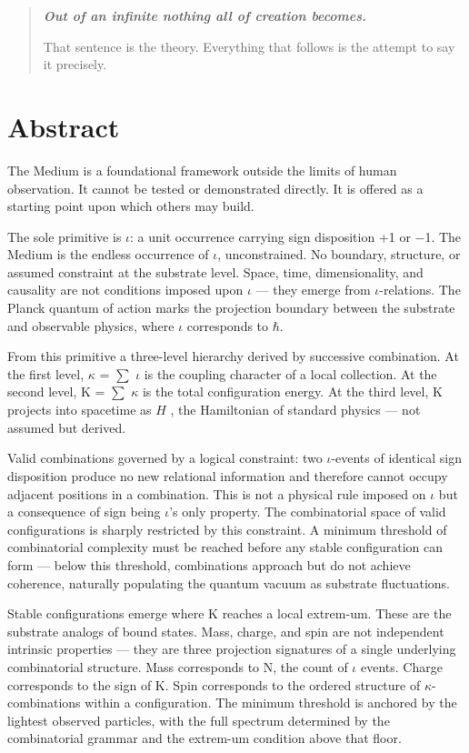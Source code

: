 \documentclass[11pt,letterpaper]{article}
\begin{document}
\begin{quote}
\emph{\textbf{Out of an infinite nothing all of creation becomes.}}

That sentence is the theory. Everything that follows is the attempt to say it precisely.
\end{quote}
\section{Abstract}
\label{sec:org16523cd}

The Medium is a foundational framework outside the limits of human observation. It cannot be tested or demonstrated directly. It is offered as a starting point upon which others may build.

The sole primitive is \(\iota\): a unit occurrence carrying sign disposition +1 or −1. The Medium is the endless occurrence of \(\iota\), unconstrained. No boundary, structure, or assumed constraint at the substrate level. Space, time, dimensionality, and causality are not conditions imposed upon \(\iota\) — they emerge from \(\iota\)-relations. The Planck quantum of action marks the projection boundary between the substrate and observable physics, where \(\iota\) corresponds to \(\hbar\).


From this primitive a three-level hierarchy derived by successive combination. At the first level, \(\kappa\) = \(\sum\) \(\iota\) is the coupling character of a local collection. At the second level, K = \(\sum\) \(\kappa\) is the total configuration energy. At the third level, K projects into spacetime as \(\hat{H}\) , the Hamiltonian of standard physics — not assumed but derived.

Valid combinations governed by a logical constraint: two \(\iota\)-events of identical sign disposition produce no new relational information and therefore cannot occupy adjacent positions in a combination. This is not a physical rule imposed on \(\iota\) but a consequence of sign being \(\iota\)'s only property. The combinatorial space of valid configurations is sharply restricted by this constraint. A minimum threshold of combinatorial complexity must be reached before any stable configuration can form — below this threshold, combinations approach but do not achieve coherence, naturally populating the quantum vacuum as substrate fluctuations.

Stable configurations emerge where K reaches a local extrem-um. These are the substrate analogs of bound states. Mass, charge, and spin are not independent intrinsic properties — they are three projection signatures of a single underlying combinatorial structure. Mass corresponds to N, the count of \(\iota\) events. Charge corresponds to the sign of K. Spin corresponds to the ordered structure of \(\kappa\)-combinations within a configuration. The minimum threshold is anchored by the lightest observed particles, with the full spectrum determined by the combinatorial grammar and the extrem-um condition above that floor.
\end{document}
